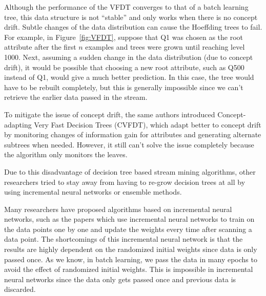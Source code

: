 \documentclass[conference]{IEEEtran}
\begin{document}
		Although the performance of the VFDT converges to that of a batch learning tree, this data structure is not ``stable'' and only works when there is no concept drift. Subtle changes of the data distribution can cause the Hoeffding trees to fail. For example, in Figure~\ref{fig:VFDT}, suppose that Q1 was chosen as the root attribute after the first $n$ examples and trees were grown until reaching level 1000. Next, assuming a sudden change in the data distribution (due to concept drift), it would be possible that choosing a new root attribute, such as Q500 instead of Q1, would give a much better prediction. In this case, the tree would have to be rebuilt completely, but this is generally impossible since we can't retrieve the earlier data passed in the stream.
		
		To mitigate the issue of concept drift, the same authors introduced Concept-adapting Very Fast Decision Trees (CVFDT), which adapt better to concept drift by monitoring changes of information gain for attributes and generating alternate subtrees when needed. However, it still can't solve the issue completely because the algorithm only monitors the leaves.
		
		
		Due to this disadvantage of decision tree based stream mining algorithms, other researchers tried to stay away from having to re-grow decision trees at all by using incremental neural networks or ensemble methods.
		
		Many researchers have proposed algorithms based on incremental neural networks, such as the papers \cite{NN1,NN2,NN3,NN4} which use incremental neural networks to train on the data points one by one and update the weights every time after scanning a data point. The shortcomings of this incremental neural network is that the results are highly dependent on the randomized initial weights since data is only passed once. As we know, in batch learning, we pass the data in many epochs to avoid the effect of randomized initial weights. This is impossible in incremental neural networks since the data only gets passed once and previous data is discarded.
		
\end{document}
